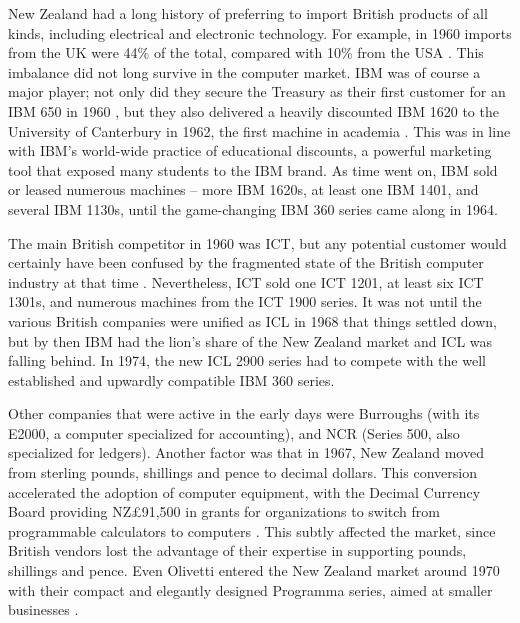 \documentclass{IEEEcsmag}
\begin{document}
New Zealand had a long history of preferring to import British products of all kinds, including electrical and electronic technology.
For example, in 1960 imports from the UK were 44\% of the total, compared with 10\% from the USA \cite{Yearbook62}. This imbalance did not long survive in the computer market.
IBM was of course a major player; not only did they secure the Treasury as their first customer for an IBM 650 in 1960 \cite{FirstCinNZ}, but they also delivered a heavily discounted IBM 1620 to the University of Canterbury in 1962, the first machine in academia \cite{Dale-Canty2}. This was in line with IBM’s world-wide practice of educational discounts, a powerful marketing tool that exposed many students to the IBM brand. As time went on, IBM sold or leased numerous machines -- more IBM 1620s, at least one IBM 1401, and several IBM 1130s, until the game-changing IBM 360 series came along in 1964.

The main British competitor in 1960 was ICT, but any potential customer would certainly have been confused by the fragmented state of the British computer industry at that time \cite{Hendry-1989}.
Nevertheless, ICT sold one ICT 1201, at least six ICT 1301s, and numerous machines from the ICT 1900 series.
It was not until the various British companies were unified as ICL in 1968 that things settled down, but by then IBM had the lion’s share of the New Zealand market and ICL was falling behind. In 1974, the new ICL 2900 series had to compete with the well established and upwardly compatible IBM 360 series.

Other companies that were active in the early days were Burroughs (with its E2000, a computer specialized for accounting), and NCR (Series 500, also specialized for ledgers). Another factor was that in 1967, New Zealand moved from sterling pounds, shillings and pence to decimal dollars. This conversion accelerated the adoption of computer equipment, with the Decimal Currency Board providing NZ£91,500 in grants for organizations to switch from programmable calculators to computers \cite{Treasury-1966}. This subtly affected the market, since British vendors lost the advantage of their expertise in supporting pounds, shillings and pence. Even Olivetti entered the New Zealand market around 1970 with their compact and elegantly designed Programma series, aimed at smaller businesses \cite{Taupo-Olivetti-1970}. 
\end{document}
